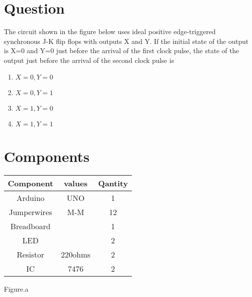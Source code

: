 \documentclass[journal,12pt]{article}
\title{\mytitle}
\author{\myauthor\hspace{1em}\\\contact\\IITH\hspace{0.5em}-\hspace{0.6em}\mymodule}
\date{20-07-2023}
\begin{document}
\theoremstyle{definition}
\newtheorem{theorem}{Theorem}[section]
\newtheorem{problem}{Problem}
\newtheorem{proposition}{Proposition}[section]
\newtheorem{lemma}{Lemma}[section]
\newtheorem{corollary}[theorem]{Corollary}
\newtheorem{example}{Example}[section]
\newtheorem{definition}{Definition}[section]
\newcommand{\BEQA}{\begin{eqnarray}}
\newcommand{\EEQA}{\end{eqnarray}}
\newcommand{\define}{\stackrel{\triangle}{=}}

\vspace{3cm}
\maketitle
\tableofcontents
\pagebreak
\section{Question}
 The circuit shown in the figure below uses ideal positive edge-triggered synchronous J-K flip flops with outputs X and Y. If the initial state of the output is X=0 and Y=0 just before the arrival of the first clock pulse, the state of the output just before the arrival of the second clock pulse is
\begin{figure}[h]
        \centering
	
	\caption{}
\end{figure}
\begin{enumerate}
    \item $X=0, Y=0$
    \item $X=0, Y=1$
    \item $X=1, Y=0$
    \item $X=1, Y=1$
\end{enumerate}
\section{Components}
\begin{table}[h]
\centering
\begin{tabular}{|c|c|c|}
\hline
  \textbf{Component}& \textbf{values} & \textbf{Qantity}\\
\hline
  Arduino & UNO & 1 \\
\hline
  Jumperwires & M-M & 12 \\
\hline
  Breadboard & & 1 \\
\hline
  LED & & 2\\
\hline
  Resistor & 220ohms & 2 \\
\hline
  IC & 7476 & 2 \\
\hline
\end{tabular}
\end{table}
\begin{center}
Figure.a
\end{center}
\end{document}
